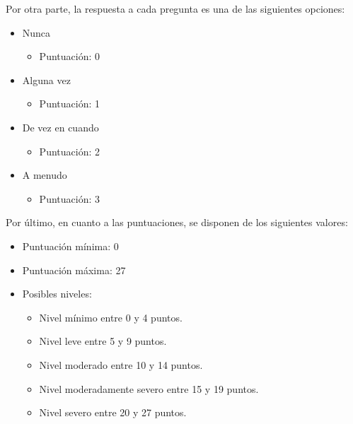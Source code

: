         Por otra parte, la respuesta a cada pregunta es una de las siguientes opciones:
        \begin{itemize}
            \item Nunca
                \begin{itemize}
                    \item Puntuación: 0
                \end{itemize}
            \item Alguna vez
                \begin{itemize}
                    \item Puntuación: 1
                \end{itemize}
            \item De vez en cuando
                \begin{itemize}
                    \item Puntuación: 2
                \end{itemize}
            \item A menudo
                \begin{itemize}
                    \item Puntuación: 3
                \end{itemize}
        \end{itemize}

        Por último, en cuanto a las puntuaciones, se disponen de los siguientes valores:
        \begin{itemize}
            \item Puntuación mínima: 0
            \item Puntuación máxima: 27
            \item Posibles niveles:
                \begin{itemize}
                    \item Nivel mínimo entre 0 y 4 puntos.
                    \item Nivel leve entre 5 y 9 puntos.
                    \item Nivel moderado entre 10 y 14 puntos.
                    \item Nivel moderadamente severo entre 15 y 19 puntos.
                    \item Nivel severo entre 20 y 27 puntos.
                \end{itemize}
        \end{itemize} 


